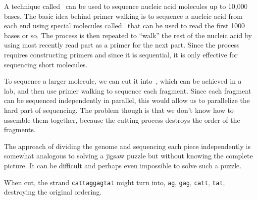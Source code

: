 \begin{gram}  
A technique called~ can be used to sequence
nucleic acid molecules up to 10,000 bases.  
%
The basic idea behind primer walking is to sequence a nucleic acid
from each end using special molecules called~ that can
be used to read the first 1000 bases or so.
%
The process is then repeated to ``walk'' the rest of the nucleic acid
by using most recently read part as a primer for the next part.
%
Since the process requires constructing primers and since it is
sequential, it is only effective for sequencing short molecules.
\end{gram}


%

\begin{gram}[Fragments]
To sequence a larger molecule, we can cut it into~,
which can be achieved in a lab, and then use primer walking to sequence
each fragment.
%
Since each fragment can be sequenced independently in parallel, this
would allow us to parallelize the hard part of sequencing.
%
The problem though is that we don't know how to assemble them
together, because the cutting process destroys the order of the
fragments.
%
%
\end{gram}

\begin{note}
The approach of dividing the genome and sequencing each piece
independently is somewhat analogous to solving a jigsaw puzzle but
without knowing the complete picture.
%
It can be difficult and perhaps even impossible to solve such a
puzzle.
\end{note}

\begin{example}
When cut, the strand \texttt{cattaggagtat} might turn into,
\texttt{ag}, \texttt{gag}, \texttt{catt}, \texttt{tat}, destroying the
original ordering.
\end{example}


